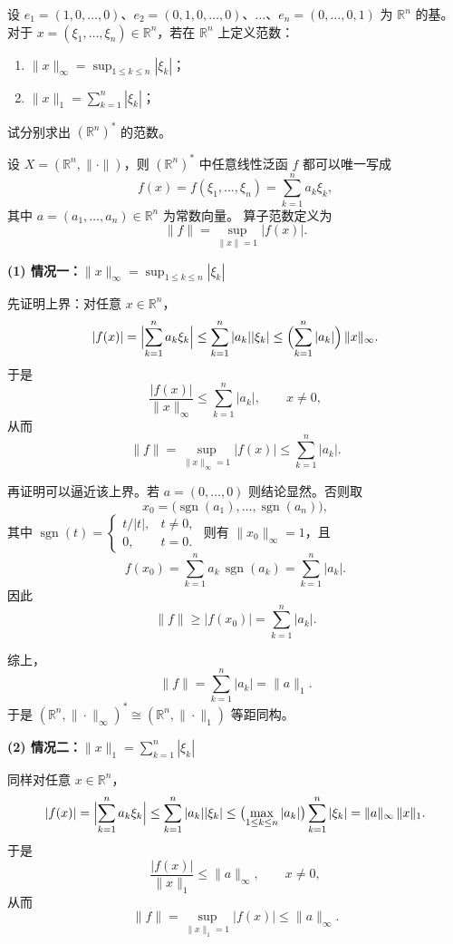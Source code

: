 \begin{homework}[题目 2]

设 $e_1=(1,0,\ldots,0)$、$e_2=(0,1,0,\ldots,0)$、$\ldots$、$e_n=(0,\ldots,0,1)$ 为 $\mathbb{R}^n$ 的基。
对于 $x=(\xi_1,\ldots,\xi_n)\in \mathbb{R}^n$，若在 $\mathbb{R}^n$ 上定义范数：

\begin{enumerate}
  \item[(1)] $\displaystyle \|x\|_\infty=\sup_{1\le k\le n} |\xi_k|$；
  \item[(2)] $\displaystyle \|x\|_1=\sum_{k=1}^n |\xi_k|$；
\end{enumerate}

试分别求出 $(\mathbb{R}^n)^*$ 的范数。

\end{homework}
\begin{solution}
设 $X = (\mathbb{R}^n,\|\cdot\|)$，则 $(\mathbb{R}^n)^*$ 中任意线性泛函 $f$ 都可以唯一写成
\[
f(x)=f(\xi_1,\dots,\xi_n)=\sum_{k=1}^n a_k \xi_k,
\]
其中 $a=(a_1,\dots,a_n)\in\mathbb{R}^n$ 为常数向量。
算子范数定义为
\[
\|f\|=\sup_{\|x\|=1} |f(x)|.
\]

\medskip
\noindent\textbf{(1) 情况一：$\displaystyle \|x\|_\infty = \sup_{1\le k\le n}|\xi_k|$}

先证明上界：对任意 $x\in\mathbb{R}^n$，
\[
|f(x)|
= \Bigl|\sum_{k=1}^n a_k\xi_k\Bigr|
\le \sum_{k=1}^n |a_k||\xi_k|
\le \Bigl(\sum_{k=1}^n |a_k|\Bigr)\,\|x\|_\infty.
\]
于是
\[
\frac{|f(x)|}{\|x\|_\infty}\le \sum_{k=1}^n |a_k|,\qquad x\neq0,
\]
从而
\[
\|f\|=\sup_{\|x\|_\infty=1}|f(x)|\le \sum_{k=1}^n |a_k|.
\]

再证明可以逼近该上界。若 $a=(0,\dots,0)$ 则结论显然。否则取
\[
x_0=\bigl(\operatorname{sgn}(a_1),\dots,\operatorname{sgn}(a_n)\bigr),
\]
其中
\(
\operatorname{sgn}(t)=\begin{cases}
t/|t|, & t\neq0,\\[2pt]
0, & t=0.
\end{cases}
\)
则有 $\|x_0\|_\infty =1$，且
\[
f(x_0)=\sum_{k=1}^n a_k\,\operatorname{sgn}(a_k)
=\sum_{k=1}^n |a_k|.
\]
因此
\[
\|f\|\ge |f(x_0)|=\sum_{k=1}^n |a_k|.
\]

综上，
\[
\|f\|=\sum_{k=1}^n |a_k| = \|a\|_1.
\]
于是 $(\mathbb{R}^n,\|\cdot\|_\infty)^* \cong (\mathbb{R}^n,\|\cdot\|_1)$ 等距同构。

\medskip
\noindent\textbf{(2) 情况二：$\displaystyle \|x\|_1 = \sum_{k=1}^n|\xi_k|$}

同样对任意 $x\in\mathbb{R}^n$，
\[
|f(x)|
= \Bigl|\sum_{k=1}^n a_k\xi_k\Bigr|
\le \sum_{k=1}^n |a_k||\xi_k|
\le \bigl(\max_{1\le k\le n}|a_k|\bigr)\sum_{k=1}^n|\xi_k|
= \|a\|_\infty\,\|x\|_1.
\]
于是
\[
\frac{|f(x)|}{\|x\|_1}\le \|a\|_\infty,\qquad x\neq0,
\]
从而
\[
\|f\|=\sup_{\|x\|_1=1}|f(x)|\le \|a\|_\infty.
\]


\end{solution}
